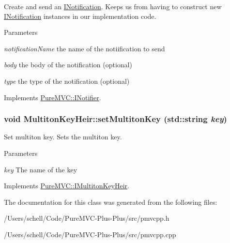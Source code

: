 Create and send an {\ttfamily \hyperlink{class_pure_m_v_c_1_1_i_notification}{INotification}}. Keeps us from having to construct new \hyperlink{class_pure_m_v_c_1_1_i_notification}{INotification} instances in our implementation code. 
\begin{DoxyParams}{Parameters}
\item[{\em notificationName}]the name of the notiification to send \item[{\em body}]the body of the notification (optional) \item[{\em type}]the type of the notification (optional) \end{DoxyParams}


Implements \hyperlink{class_pure_m_v_c_1_1_i_notifier_a65e8333ccfea74138b79f84dac96af25}{PureMVC::INotifier}.\hypertarget{class_pure_m_v_c_1_1_multiton_key_heir_abc70ef7c066bc8d7bf0196ec727599bb}{
\subsubsection[{setMultitonKey}]{\setlength{\rightskip}{0pt plus 5cm}void MultitonKeyHeir::setMultitonKey (std::string {\em key})}}
\label{class_pure_m_v_c_1_1_multiton_key_heir_abc70ef7c066bc8d7bf0196ec727599bb}


Set multiton key. Sets the multiton key. 
\begin{DoxyParams}{Parameters}
\item[{\em key}]The name of the key \end{DoxyParams}


Implements \hyperlink{class_pure_m_v_c_1_1_i_multiton_key_heir_a03acb75ab79defba2c28b8de1bbe1ca6}{PureMVC::IMultitonKeyHeir}.

The documentation for this class was generated from the following files:\begin{DoxyCompactItemize}
\item 
/Users/schell/Code/PureMVC-\/Plus-\/Plus/src/pmvcpp.h\item 
/Users/schell/Code/PureMVC-\/Plus-\/Plus/src/pmvcpp.cpp\end{DoxyCompactItemize}
